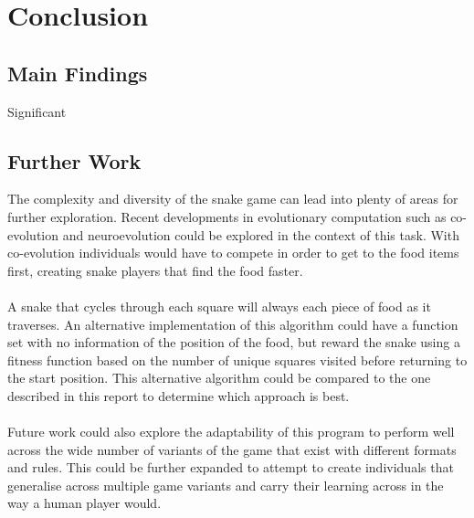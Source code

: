 \documentclass{article}
\begin{document}




\section{Conclusion} %
\subsection{Main Findings}
Significant


\subsection{Further Work}
The complexity and diversity of the snake game can lead into plenty of areas for further exploration. Recent developments in evolutionary computation such as co-evolution and neuroevolution could be explored in the context of this task. With co-evolution individuals would have to compete in order to get to the food items first, creating snake players that find the food faster.
\\\\
A snake that cycles through each square will always each piece of food as it traverses. An alternative implementation of this algorithm could have a function set with no information of the position of the food, but reward the snake using a fitness function based on the number of unique squares visited before returning to the start position. This alternative algorithm could be compared to the one described in this report to determine which approach is best.
\\\\
Future work could also explore the adaptability of this program to perform well across the wide number of variants of the game that exist with different formats and rules. This could be further expanded to attempt to create individuals that generalise across multiple game variants and carry their learning across in the way a human player would.
\end{document}
